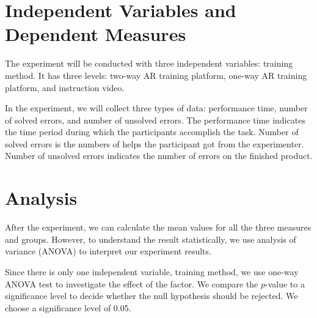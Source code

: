 \section{Independent Variables and Dependent Measures}

The experiment will be conducted with three independent variables: training method. It has three levels: two-way AR training platform, one-way AR training platform, and instruction video.

In the experiment, we will collect three types of data: performance time, number of solved errors, and number of unsolved errors.
The performance time indicates the time period during which the participants accomplish the task.
Number of solved errors is the numbers of helps the participant got from the experimenter.
Number of unsolved errors indicates the number of errors on the finished product.

\section{Analysis}

After the experiment, we can calculate the mean values for all the three measures and groups. However, to understand the result statistically, we use analysis of variance (ANOVA) to interpret our experiment results.

Since there is only one independent variable, training method, we use one-way ANOVA test to investigate the effect of the factor. We compare the $p$-value to a significance level to decide whether the null hypothesis should be rejected. We choose a significance level of 0.05.
